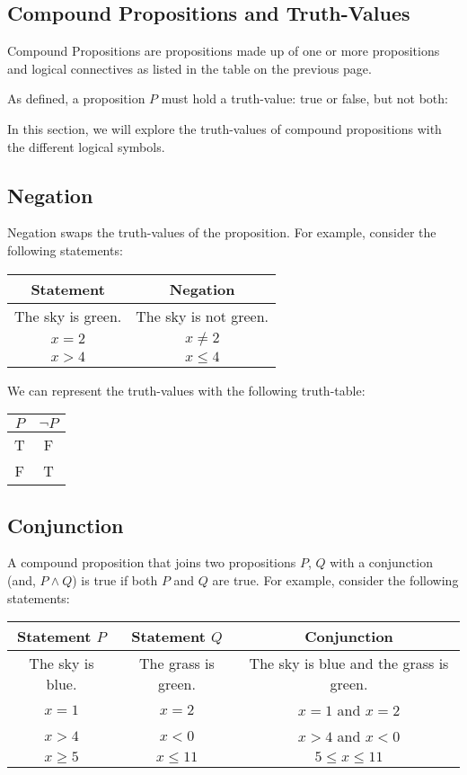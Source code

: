 \documentclass[11pt, a4paper, oneside]{exam}
\theoremstyle{definition}\newtheorem{define}{Definition}[section]
\theoremstyle{remark}\newtheorem{remark}{Remark}
\theoremstyle{definition}\newtheorem{example}{Example}[subsection]
\theoremstyle{definition}\newtheorem{notation}{Notation}[section]
\theoremstyle{definition}\newtheorem{theorem}{Theorem}[section]
\theoremstyle{definition}\newtheorem{corollary}{Corollary}[section]
\begin{document}
\subsection{Compound Propositions and Truth-Values}

Compound Propositions are propositions made up of one or more propositions and logical connectives as listed in the table on the previous page. 

As defined, a proposition $P$ must hold a truth-value: true or false, but not both:

In this section, we will explore the truth-values of compound propositions with the different logical symbols. 

\subsection{Negation}
Negation swaps the truth-values of the proposition. For example, consider the following statements:

\begin{center}
\begin{tabular}{c|c}
	Statement & Negation\\ \hline
	The sky is green. & The sky is not green.\\
	$x = 2$ & $x\not = 2$\\
	$x > 4$ & $x \leq 4$
\end{tabular}
\end{center}

We can represent the truth-values with the following truth-table:

\begin{center}
\begin{tabular}{|c|c|}\hline
	$P$ & $\neg P$\\ \hline
	T & F\\
	F & T\\ \hline
\end{tabular}
\end{center}

\subsection{Conjunction}
A compound proposition that joins two propositions $P$, $Q$ with a conjunction (and, $P\land Q$) is true if both $P$ and $Q$ are true. For example, consider the following statements:

\begin{center}
	\begin{tabular}{c|c|c}
		Statement $P$ & Statement $Q$ & Conjunction\\ \hline
		The sky is blue. & The grass is green. & The sky is blue and the grass is green.\\
		$x = 1$ & $x = 2$ & $x=1$ and $x=2$\\
		$x > 4$ & $x < 0$ & $x>4$ and $x<0$\\
		$x \geq 5$ & $x \leq 11$ & $5 \leq x \leq 11$
	\end{tabular}
\end{center}
\end{document}
